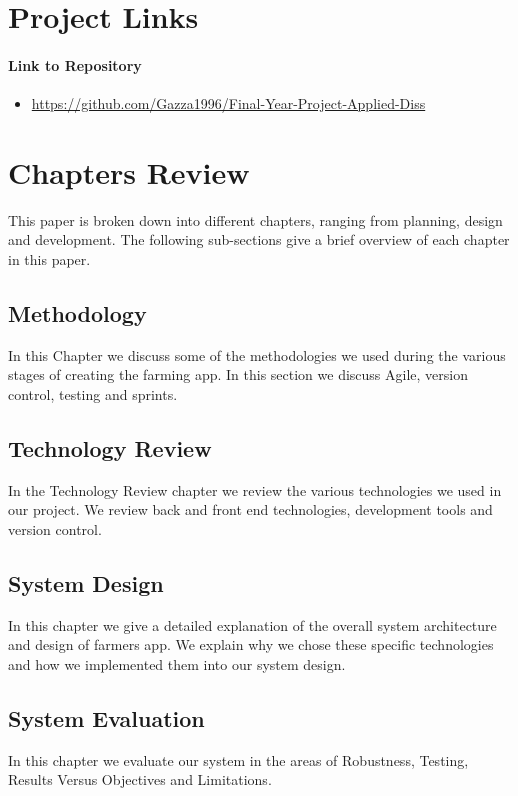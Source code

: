 \documentclass[12pt,a4paper,oneside,openany]{book}
\begin{document}
\section{Project Links}

\paragraph{Link to Repository}
\begin{itemize}
\item \href{https://github.com/Gazza1996/Final-Year-Project-Applied-Diss}{https://github.com/Gazza1996/Final-Year-Project-Applied-Diss} 
\end{itemize}

\section{Chapters Review}
This paper is broken down into different chapters, ranging from planning, design and development. The following sub-sections give a brief overview of each chapter in this paper.

\subsection{Methodology}
In this Chapter we discuss some of the methodologies we used during the various stages of creating the farming app. In this section we discuss Agile, version control, testing and sprints.

\subsection{Technology Review}
In the Technology Review chapter we review the various technologies we used in our project. We review back and front end technologies, development tools and version control.

\subsection{System Design}
In this chapter we give a detailed explanation of the overall system
architecture and design of farmers app. We explain why we chose these specific technologies and how we implemented them into our system design.


\subsection{System Evaluation}
In this chapter we evaluate our system in the areas of Robustness, Testing, Results Versus Objectives and Limitations.
\end{document}

